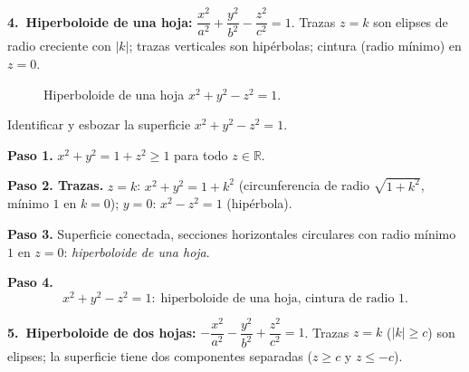 \medskip
\noindent\textbf{4.\ Hiperboloide de una hoja:}
$\dfrac{x^2}{a^2}+\dfrac{y^2}{b^2}-\dfrac{z^2}{c^2}=1$.
Trazas $z=k$ son elipses de radio creciente con $|k|$; trazas
verticales son hipérbolas; cintura (radio mínimo) en $z=0$.

\begin{figure}[!htbp]
\centering
{}
\caption{Hiperboloide de una hoja $x^2+y^2-z^2=1$.}
\label{fig:hiperboloide_una_hoja}
\end{figure}

\begin{example}
Identificar y esbozar la superficie $x^2 + y^2 - z^2 = 1$.
\begin{myproof}
\textbf{Paso 1.} $x^2+y^2=1+z^2\ge 1$ para todo $z\in\mathbb{R}$.

\textbf{Paso 2. Trazas.}
$z=k$: $x^2+y^2=1+k^2$ (circunferencia de radio $\sqrt{1+k^2}$, mínimo $1$ en $k=0$);
$y=0$: $x^2-z^2=1$ (hipérbola).

\textbf{Paso 3.} Superficie conectada, secciones horizontales circulares
con radio mínimo $1$ en $z=0$: \emph{hiperboloide de una hoja}.

\textbf{Paso 4.}
\[\boxed{x^2+y^2-z^2=1:\;\text{hiperboloide de una hoja, cintura de radio }1.}\]
\end{myproof}
\end{example}

\medskip
\noindent\textbf{5.\ Hiperboloide de dos hojas:}
$-\dfrac{x^2}{a^2}-\dfrac{y^2}{b^2}+\dfrac{z^2}{c^2}=1$.
Trazas $z=k$ ($|k|\ge c$) son elipses; la superficie tiene dos
componentes separadas ($z\ge c$ y $z\le -c$).

